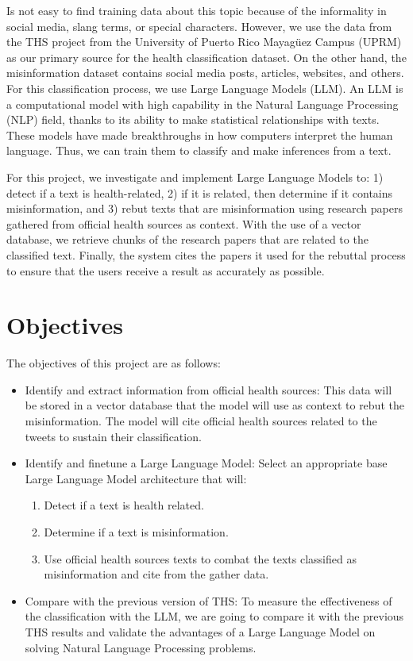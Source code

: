 Is not easy to find training data about this topic because of the informality in social media, slang terms, or special characters. However, we use the data from the THS
project from the University of Puerto Rico Mayag\"uez Campus (UPRM) as our primary source for the health classification dataset. On the other hand, the misinformation
dataset contains social media posts, articles, websites, and others. For this classification process, we use Large Language Models (LLM). An LLM is a computational
model with high capability in the Natural Language Processing (NLP) field, thanks to its ability to make statistical relationships with texts. These models have made
breakthroughs in how computers interpret the human language. Thus, we can train them to classify and make inferences from a text.

For this project, we investigate and implement Large Language Models to: 1) detect if a text is health-related, 2) if it is related, then determine if it contains misinformation,
and 3) rebut texts that are misinformation using research papers gathered from official health sources as context. With the use of a vector database, we retrieve chunks of
the research papers that are related to the classified text. Finally, the system cites the papers it used for the rebuttal process to ensure that the users receive a result as accurately as possible.

\section{Objectives}

\noindent
The objectives of this project are as follows:
\begin{itemize}
	\item Identify and extract information from official health sources: This data will be stored in a vector database that the model will use as context to rebut the misinformation. The model will cite official health sources related to the tweets to sustain their classification.
	\item Identify and finetune a Large Language Model: Select an appropriate base Large Language Model architecture that will:
	\begin{enumerate}
		\item Detect if a text is health related.
		\item Determine if a text is misinformation.
		\item Use official health sources texts to combat the texts classified as misinformation and cite from the gather data.
	\end{enumerate}
	\item Compare with the previous version of THS: To measure the effectiveness of the classification with the LLM, we are going to compare it with the previous THS results and validate the advantages of a Large Language Model on solving Natural Language Processing problems. 
\end{itemize}

